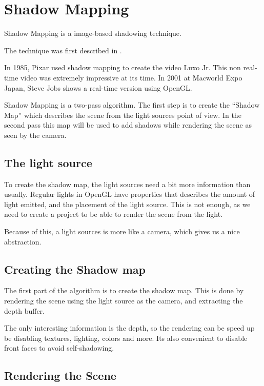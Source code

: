 
\section{Shadow Mapping}

Shadow Mapping is a image-based shadowing technique.

The technique was first described in \cite{lance78}.

In 1985, Pixar used shadow mapping to create the video Luxo Jr. This
non real-time video was extremely impressive at its time.
In 2001 at Macworld Expo Japan, Steve Jobs shows a real-time version
using OpenGL.


Shadow Mapping is a two-pass algorithm. The first step is to create
the ``Shadow Map'' which describes the scene from the light sources
point of view. In the second pass this map will be used to add shadows
while rendering the scene as seen by the camera.


\subsection{The light source}

To create the shadow map, the light sources need a bit more
information than usually. Regular lights in OpenGL have properties
that describes the amount of light emitted, and the placement of the
light source. This is not enough, as we need to create a project to be
able to render the scene from the light. 

Because of this, a light sources is more like a camera, which gives us
a nice abstraction. 


\subsection{Creating the Shadow map}

The first part of the algorithm is to create the shadow map. This is
done by rendering the scene using the light source as the camera, and
extracting the depth buffer.

 The only interesting information is
the depth, so the rendering can be speed up be disabling textures,
lighting, colors and more. Its also convenient to disable front faces
to avoid self-shadowing. %


\subsection{Rendering the Scene}


